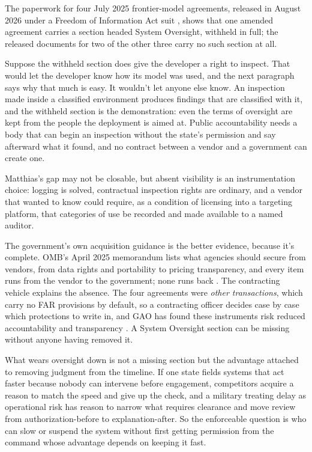 The paperwork for four July 2025 frontier-model agreements, released in August 2026 under a Freedom of Information Act suit \autocite{lasst2026dodai,biddle2026contracts}, shows that one amended agreement carries a section headed System Oversight, withheld in full; the released documents for two of the other three carry no such section at all.

Suppose the withheld section does give the developer a right to inspect. That would let the developer know how its model was used, and the next paragraph says why that much is easy. It wouldn't let anyone else know. An inspection made inside a classified environment produces findings that are classified with it, and the withheld section is the demonstration: even the terms of oversight are kept from the people the deployment is aimed at. Public accountability needs a body that can begin an inspection without the state's permission and say afterward what it found, and no contract between a vendor and a government can create one.

Matthias's gap may not be closable, but absent visibility is an instrumentation choice: logging is solved, contractual inspection rights are ordinary, and a vendor that wanted to know could require, as a condition of licensing into a targeting platform, that categories of use be recorded and made available to a named auditor.

The government's own acquisition guidance is the better evidence, because it's complete. OMB's April 2025 memorandum lists what agencies should secure from vendors, from data rights and portability to pricing transparency, and every item runs from the vendor to the government; none runs back \autocite{omb2025aiacquisition}. The contracting vehicle explains the absence. The four agreements were \emph{other transactions}, which carry no FAR provisions by default, so a contracting officer decides case by case which protections to write in, and GAO has found these instruments risk reduced accountability and transparency \autocite{gao2026aiacquisitions}. A System Oversight section can be missing without anyone having removed it.

What wears oversight down is not a missing section but the advantage attached to removing judgment from the timeline. If one state fields systems that act faster because nobody can intervene before engagement, competitors acquire a reason to match the speed and give up the check, and a military treating delay as operational risk has reason to narrow what requires clearance and move review from authorization-before to explanation-after.
So the enforceable question is who can slow or suspend the system without first getting permission from the command whose advantage depends on keeping it fast.
